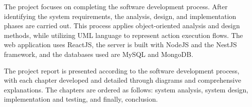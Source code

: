 The project focuses on completing the software development process. 
After identifying the system requirements, the analysis, design, and implementation phases are carried out. 
This process applies object-oriented analysis and design methods, while utilizing UML language to represent action execution flows. 
The web application uses ReactJS, the server is built with NodeJS and the NestJS framework, and the databases used are MySQL and MongoDB.

The project report is presented according to the software development process, with each chapter developed and detailed through diagrams and comprehensive explanations. 
The chapters are ordered as follows: system analysis, system design, implementation and testing, and finally, conclusion.

\cleardoublepage



